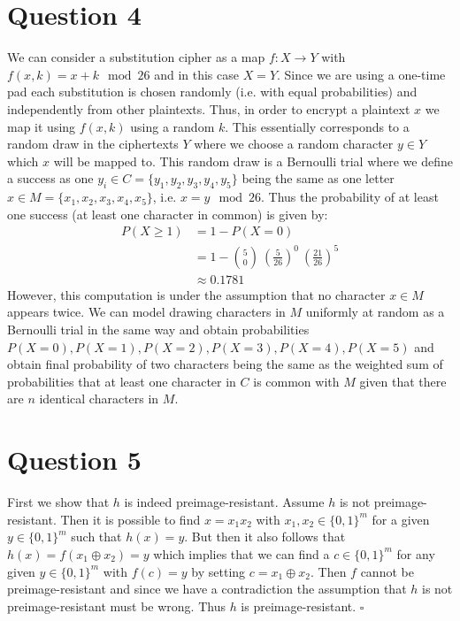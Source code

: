 \documentclass[11pt]{article}
\begin{document}
\section*{Question 4}

We can consider a substitution cipher as a map $f: X \rightarrow Y$ with $f(x,k) = x+k \mod 26$ and in this case $X = Y$. Since we are using a one-time pad each substitution is chosen randomly (i.e. with equal probabilities) and independently from other plaintexts. Thus, in order to encrypt a plaintext $x$ we map it using $f(x,k)$ using a random $k$. This essentially corresponds to a random draw in the ciphertexts $Y$ where we choose a random character $y \in Y$ which $x$ will be mapped to. This random draw is a Bernoulli trial where we define a success as one $y_i \in C = \{y_1, y_2, y_3, y_4, y_5 \}$ being the same as one letter $x \in M = \{x_1,x_2,x_3,x_4,x_5 \}$, i.e. $x = y \mod 26$. Thus the probability of at least one success (at least one character in common) is given by:
\begin{align*}
    P(X \geq 1) &= 1 - P(X=0) \\
    &= 1 - {5 \choose 0} \ \left(\frac{5}{26}\right)^0 \ \left(\frac{21}{26}\right)^5 \\
    &\approx 0.1781
\end{align*}
However, this computation is under the assumption that no character $x \in M$ appears twice. We can model drawing characters in $M$ uniformly at random as a Bernoulli trial in the same way and obtain probabilities $P(X=0), P(X=1), P(X=2), P(X=3), P(X=4), P(X=5)$ and obtain final probability of two characters being the same as the weighted sum of probabilities that at least one character in $C$ is common with $M$ given that there are $n$ identical characters in $M$.

\section*{Question 5}

First we show that $h$ is indeed preimage-resistant. Assume $h$ is not preimage-resistant. Then it is possible to find $x=x_1 x_2$ with $x_1,x_2 \in \{0,1\}^m$ for a given $y \in \{0,1\}^m$ such that $h(x) = y$. But then it also follows that $h(x) = f(x_1 \oplus x_2) = y$ which implies that we can find a $c \in \{0,1\}^m$ for any given $y \in \{0,1\}^m$ with $f(c) = y$ by setting $c = x_1 \oplus x_2$. Then $f$ cannot be preimage-resistant and since we have a contradiction the assumption that $h$ is not preimage-resistant must be wrong. Thus $h$ is preimage-resistant. $\square$
\end{document}
